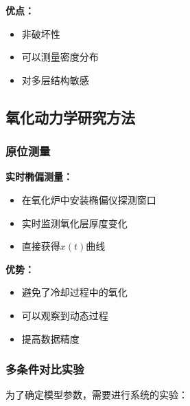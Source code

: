 \documentclass[UTF8,12pt,a4paper]{ctexart}
\begin{document}
\textbf{优点：}
\begin{itemize}
    \item 非破坏性
    \item 可以测量密度分布
    \item 对多层结构敏感
\end{itemize}

\subsection{氧化动力学研究方法}

\subsubsection{原位测量}

\textbf{实时椭偏测量：}
\begin{itemize}
    \item 在氧化炉中安装椭偏仪探测窗口
    \item 实时监测氧化层厚度变化
    \item 直接获得$x(t)$曲线
\end{itemize}

\textbf{优势：}
\begin{itemize}
    \item 避免了冷却过程中的氧化
    \item 可以观察到动态过程
    \item 提高数据精度
\end{itemize}

\subsubsection{多条件对比实验}

为了确定模型参数，需要进行系统的实验：
\end{document}

